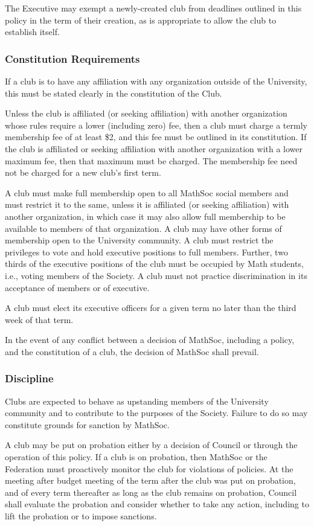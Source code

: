 The Executive may exempt a newly-created club from deadlines outlined in this
policy in the term of their creation, as is appropriate to allow the club to
establish itself.

\subsubsection{Constitution Requirements}
If a club is to have any affiliation with any organization outside of the
University, this must be stated clearly in the constitution of the Club.

Unless the club is affiliated (or seeking affiliation) with another organization
whose rules require a lower (including zero) fee, then a club must charge a
termly membership fee of at least \$2, and this fee must be outlined in its
constitution. If the club is affiliated or seeking affiliation with another
organization with a lower maximum fee, then that maximum must be charged. The
membership fee need not be charged for a new club's first term.

A club must make full membership open to all MathSoc social members and must
restrict it to the same, unless it is affiliated (or seeking affiliation) with
another organization, in which case it may also allow full membership to be
available to members of that organization. A club may have other forms of
membership open to the University community. A club must restrict the privileges
to vote and hold executive positions to full members. Further, two thirds of the executive positions of the club must be occupied by Math students, i.e., voting members of the Society. A club must not practice discrimination in its acceptance of members or of executive.

A club must elect its executive officers for a given term no later than the
third week of that term.

In the event of any conflict between a decision of MathSoc, including a policy,
and the constitution of a club, the decision of MathSoc shall prevail.

\subsubsection{Discipline}
Clubs are expected to behave as upstanding members of the University community
and to contribute to the purposes of the Society. Failure to do so may
constitute grounds for sanction by MathSoc.

A club may be put on probation either by a decision of Council or through the
operation of this policy. If a club is on probation, then MathSoc or the
Federation must proactively monitor the club for violations of policies. At the
meeting after budget meeting of the term after the club was put on probation,
and of every term thereafter as long as the club remains on probation, Council
shall evaluate the probation and consider whether to take any action, including
to lift the probation or to impose sanctions.

